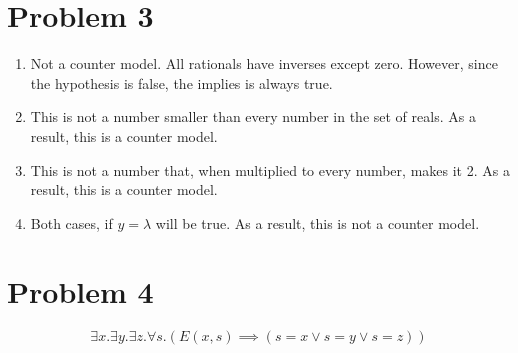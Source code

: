 \documentclass{article}
\begin{document}
\section*{Problem 3}

\begin{enumerate}[1.]
  \item Not a counter model. All rationals have inverses except zero. However,
    since the hypothesis is false, the implies is always true.
  \item This is not a number smaller than every number in the set of reals. As a
    result, this is a counter model.
  \item This is not a number that, when multiplied to every number, makes it 2.
    As a result, this is a counter model.
  \item Both cases, if $y = \lambda$ will be true. As a result, this is not a
    counter model.
\end{enumerate}

\section*{Problem 4}

$$ \exists x . \exists y . \exists z . \forall s . (E(x, s) \implies (s = x \lor
s = y \lor s = z)) $$
\end{document}

